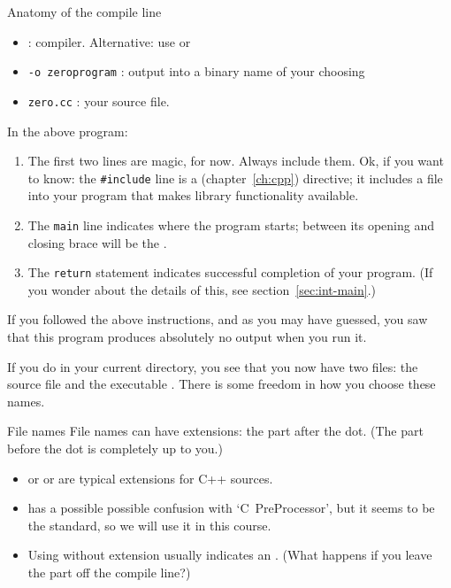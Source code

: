 \begin{slide}{Anatomy of the compile line}
  \label{sl:compile-line}
  \begin{itemize}
  \item {} : compiler. Alternative: use 
    or 
  \item \texttt{-o zeroprogram} : output into a binary name of your choosing
  \item \texttt{zero.cc} : your source file.
  \end{itemize}
\end{slide}

In the above program:
\begin{enumerate}
\item The first two lines are magic, for now. Always include them.
  Ok, if you want to know: the \lstinline+#include+ line
  is a  (chapter~\ref{ch:cpp}) directive;
  it includes a 
  file into your program that makes library functionality available.
\item The \lstinline{main} line indicates where the program starts; between
  its opening and closing brace will be the
  .
\item The \lstinline{return} statement indicates successful completion of your program.
  (If you wonder about the details of this, see section~\ref{sec:int-main}.)
\end{enumerate}
If you followed the above instructions, 
and as you may have guessed,
you saw that this program produces absolutely no output
when you run it.

If you do  in your current directory,
you see that you now have two files: the source file 
and the executable .
There is some freedom in how you choose these names.

\begin{block}{File names}
  \label{sl:file-ext}
  File names can have extensions: the part after the dot.
  (The part before the dot is completely up to you.)
  \begin{itemize}
  \item {} or  or 
    are typical extensions for
    C++ sources.
  \item {} has a possible
    possible confusion with `C~PreProcessor',
    but it seems to be the standard, so we will use it in this course.
  \item Using  without extension usually indicates an .
    (What happens if you leave the  part off the compile line?)
  \end{itemize}
\end{block}


